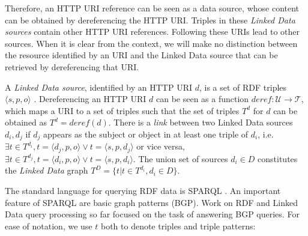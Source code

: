 Therefore, an HTTP URI reference can be seen as a data source, whose
content can be obtained by dereferencing the HTTP URI. Triples in
these \emph{Linked Data sources} contain other HTTP URI
references. Following these URIs lead to other sources. When it is
clear from the context, we will make no distinction between the
resource identified by an URI and the Linked Data source that can be
retrieved by dereferencing that URI.

\begin{definition}
  A \emph{Linked Data source}, identified by an HTTP URI $d$, is a set
  of RDF triples $\langle s,p,o \rangle$ . Dereferencing an HTTP URI
  $d$ can be seen as a function $deref : \mathcal{U} \rightarrow
  \mathcal{T}$, which maps a URI to a set of triples such that the set
  of triples $T^d$ for $d$ can be obtained as $T^d =
  \mathit{deref}(d)$. There is a \emph{link} between two Linked Data
  sources $d_i, d_j$ if $d_j$ appears as the subject or object in at
  least one triple of $d_i$, i.e. $\exists t\in T^{d_i},t=\langle
  d_j,p,o \rangle \vee t=\langle s,p,d_j \rangle$ or vice versa,
  $\exists t\in T^{d_j},t=\langle d_i,p,o \rangle \vee t=\langle
  s,p,d_i \rangle$. The union set of sources $d_i \in D$ constitutes
  the \emph{Linked Data} graph $T^D=\{t| t \in T^{d_i}, d_i \in D\}$.

\end{definition}

The standard language for querying RDF data is SPARQL
\cite{prudhommeaux_sparql_2008}. An important feature of SPARQL are
basic graph patterns (BGP). Work on RDF and Linked Data query
processing so far focused on the task of answering BGP queries. For
 ease of notation, we use $t$ both to denote triples and triple
 patterns:


